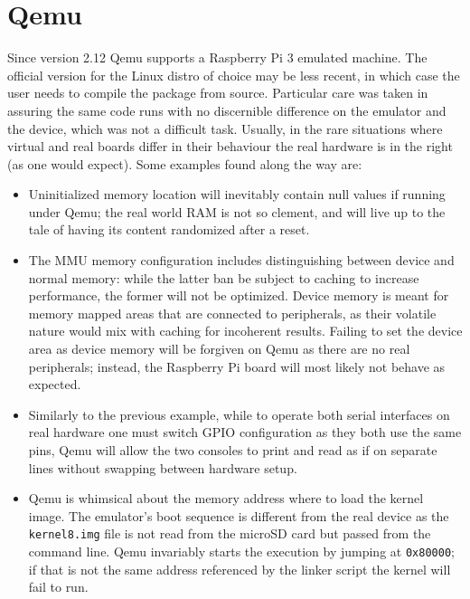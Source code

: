 \documentclass[12pt,a4paper,openright,twoside]{report}
\begin{document}
\section{Qemu}
\label{qemu}
Since version 2.12 Qemu supports a Raspberry Pi 3 emulated machine.
The official version for the Linux distro of choice may be less recent, in 
which case the user needs to compile the package from source.
 Particular care was taken in assuring the same code runs with no discernible difference on
the emulator and the device, which was not a difficult task.
Usually, in the rare situations where virtual and real boards differ in their
behaviour the real hardware is in the right (as one would expect).
Some examples found along the way are:
\begin{itemize}
    \item Uninitialized memory location will inevitably contain null values if 
        running under Qemu; the real world RAM is not so clement, and will live 
        up to the tale of having its content randomized after a reset.
    \item The MMU memory configuration includes distinguishing between device
        and normal memory: while the latter ban be subject to caching to increase performance,
        the former will not be optimized. Device memory is meant for memory mapped
        areas that are connected to peripherals, as their volatile nature would
        mix with caching for incoherent results.
        Failing to set the device area as device memory will be forgiven on Qemu
        as there are no real peripherals; instead, the Raspberry Pi board will most likely
        not behave as expected.
    \item Similarly to the previous example, while to operate both serial interfaces
        on real hardware one must switch GPIO configuration as they both use the
         same pins, Qemu will allow the two consoles to print and read as if on 
         separate lines without swapping between hardware setup.
    \item Qemu is whimsical about the memory address where to load the kernel image.
        The emulator's boot sequence is different from the real device as the
        {\tt kernel8.img} file is not read from the microSD card but passed from
        the command line. Qemu invariably starts the execution by jumping at 
        {\tt 0x80000}; if that is not the same address referenced by the linker
        script the kernel will fail to run.
\end{itemize}
\end{document}
